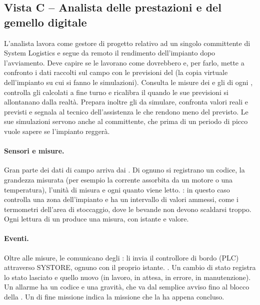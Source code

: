\subsection{Vista C -- Analista delle prestazioni e del gemello digitale}
\label{sec:req-C}
L'analista lavora come gestore di progetto relativo ad un singolo committente di System Logistics e segue da remoto il rendimento
dell'impianto dopo l'avviamento. Deve capire se le  lavorano come
dovrebbero e, per farlo, mette a confronto i dati raccolti sul campo con le previsioni del
 (la copia virtuale dell'impianto su cui si fanno le
simulazioni). Consulta le misure dei  e gli  di
ogni , controlla gli  calcolati a fine turno e ricalibra il
 quando le sue previsioni si allontanano dalla realtà. Prepara inoltre gli
 da simulare, confronta valori reali e previsti e segnala al tecnico dell'assistenza
le  che rendono meno del previsto. Le sue simulazioni servono anche al committente,
che prima di un periodo di picco vuole sapere se l'impianto reggerà.

\paragraph{Sensori e misure.}
Gran parte dei dati di campo arriva dai . Di ognuno si registrano un codice, la
grandezza misurata (per esempio la corrente assorbita da un motore o una temperatura), l'unità di misura
e ogni quanto viene letto. : in questo caso controlla una zona dell'impianto e ha un
intervallo di valori ammessi, come i termometri dell'area di stoccaggio, dove le bevande non devono
scaldarsi troppo. Ogni lettura di un  produce una misura, con istante e valore.

\paragraph{Eventi.}
Oltre alle misure, le  comunicano degli : li invia il controllore di
bordo (PLC) attraverso SYSTORE, ognuno con il proprio istante. . Un
cambio di stato registra lo stato lasciato e quello nuovo (in lavoro, in attesa, in errore, in
manutenzione). Un allarme ha un codice e una gravità, che va dal semplice avviso fino al blocco della
. Un  di fine missione indica la missione che la
 ha appena concluso.

